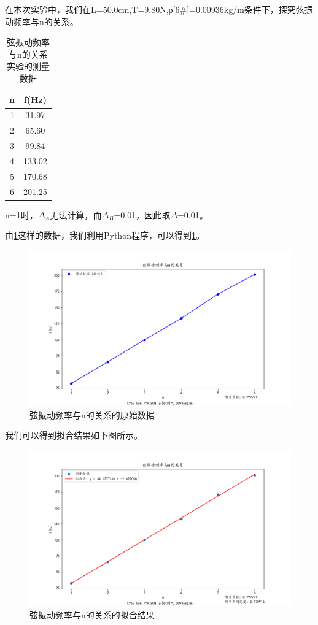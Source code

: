 在本次实验中，我们在L=50.0cm,T=9.80N,ρ[6\#]=0.00936kg/m条件下，探究弦振动频率与n的关系。
\begin{table}[h]
    \centering
    \begin{tabular}{|c|c|}
        \hline
        n & f(Hz)  \\
        \hline
        1 & 31.97  \\
        2 & 65.60  \\
        3 & 99.84  \\
        4 & 133.02 \\
        5 & 170.68 \\
        6 & 201.25 \\
        \hline
    \end{tabular}
    \caption{弦振动频率与n的关系实验的测量数据}
    \label{a487bdee}
\end{table}

n=1时，$\Delta_A$无法计算，而$\Delta_B$=0.01，因此取$\Delta$=0.01。

由\ref{a487bdee}这样的数据，我们利用Python程序，可以得到\ref{29ea3b43}。
\begin{figure}[h]
    \centering
    \includegraphics[scale=0.5]{1_original.png}
    \caption{弦振动频率与n的关系的原始数据}
    \label{29ea3b43}
\end{figure}


我们可以得到拟合结果如下图所示。
\begin{figure}[h]
    \centering
    \includegraphics[scale=0.5]{1.png}
    \caption{弦振动频率与n的关系的拟合结果}
    \label{a709445a}
\end{figure}


